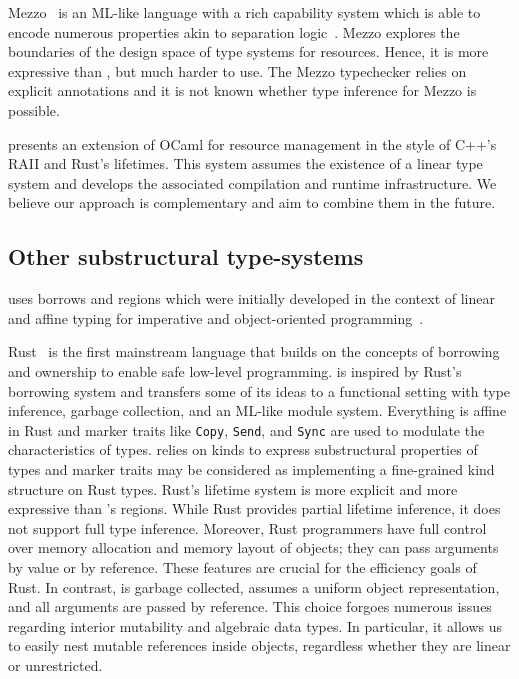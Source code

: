 Mezzo~\citep{DBLP:phd/hal/Protzenko14,DBLP:journals/toplas/BalabonskiPP16} is an ML-like language
with a rich capability system which is able to encode numerous
properties akin to separation logic~\citep{DBLP:conf/lics/Reynolds02}.
Mezzo explores the  boundaries of the design space of type systems for
resources. Hence, it is more expressive than \lang, but
much harder to use. The Mezzo typechecker relies on explicit
annotations and it is not known whether type inference for Mezzo is possible.

\citet{DBLP:journals/corr/abs-1803-02796} presents
an extension of OCaml for resource management in the style of C++'s RAII
and Rust's lifetimes. This system assumes
the existence of a linear type system and develops the associated compilation
and runtime infrastructure. We believe our approach is
complementary and aim to combine them in the future.

\subsection{Other substructural type-systems}

\lang uses borrows and regions
which were initially developed in the context of linear and affine
typing for  imperative and
object-oriented
programming~\citep{DBLP:conf/popl/BoylandR05,DBLP:conf/pldi/GrossmanMJHWC02}.

Rust~\citep{rust} is the first
mainstream language that builds on the concepts of borrowing and ownership
to enable safe low-level programming.
\lang is inspired by Rust's borrowing system and transfers some of its
ideas  to a functional setting with type inference, garbage collection, and
an ML-like module system.
Everything is affine in Rust and marker traits like \lstinline/Copy/,
\lstinline/Send/, and \lstinline/Sync/ are used to modulate the characteristics 
of types. \lang relies on kinds to express substructural properties of
types and marker traits may be considered as implementing a
fine-grained kind structure on Rust types.
Rust's lifetime system is more explicit and more expressive than
\lang's regions.
While Rust provides partial lifetime inference, it
does not support full type inference.
Moreover, Rust programmers have full control over memory allocation
and memory layout of objects; they can pass arguments by value or by reference.
These features are crucial for the efficiency goals of Rust.
In contrast, \lang is garbage collected, assumes a uniform object
representation, and all arguments are passed by reference. This choice
forgoes numerous  
issues regarding interior mutability and algebraic data types.
In particular, it
allows us to easily nest mutable references inside objects, regardless
whether they are linear or unrestricted.

